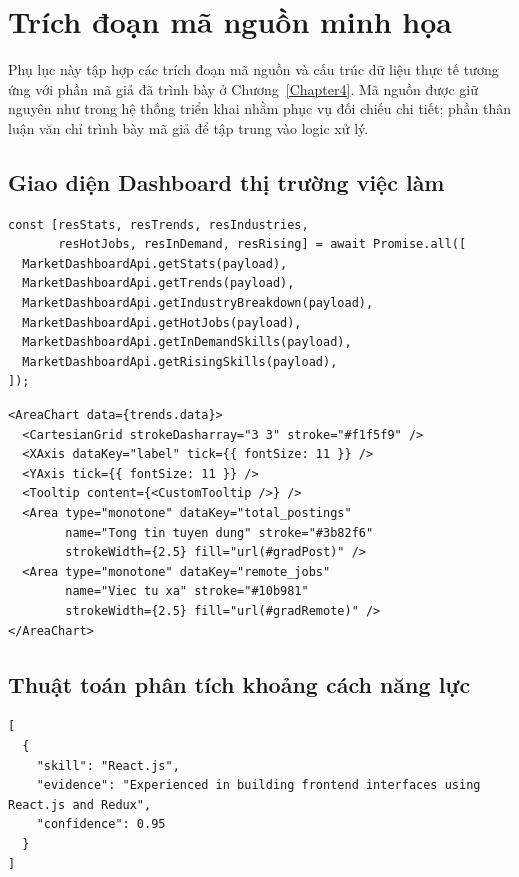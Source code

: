\chapter{Trích đoạn mã nguồn minh họa}
\label{Appendix:code}

Phụ lục này tập hợp các trích đoạn mã nguồn và cấu trúc dữ liệu thực tế tương ứng với phần mã giả đã trình bày ở Chương~\ref{Chapter4}. Mã nguồn được giữ nguyên như trong hệ thống triển khai nhằm phục vụ đối chiếu chi tiết; phần thân luận văn chỉ trình bày mã giả để tập trung vào logic xử lý.

\section{Giao diện Dashboard thị trường việc làm}

\begin{lstlisting}[caption=Khởi tạo sáu truy vấn API song song trong MarketDashboard.tsx, label=lst:code_dashboard_promise]
const [resStats, resTrends, resIndustries,
       resHotJobs, resInDemand, resRising] = await Promise.all([
  MarketDashboardApi.getStats(payload),
  MarketDashboardApi.getTrends(payload),
  MarketDashboardApi.getIndustryBreakdown(payload),
  MarketDashboardApi.getHotJobs(payload),
  MarketDashboardApi.getInDemandSkills(payload),
  MarketDashboardApi.getRisingSkills(payload),
]);
\end{lstlisting}

\begin{lstlisting}[caption=Kết xuất AreaChart xu hướng tuyển dụng bằng Recharts (trích MarketDashboard.tsx), label=lst:code_dashboard_areachart]
<AreaChart data={trends.data}>
  <CartesianGrid strokeDasharray="3 3" stroke="#f1f5f9" />
  <XAxis dataKey="label" tick={{ fontSize: 11 }} />
  <YAxis tick={{ fontSize: 11 }} />
  <Tooltip content={<CustomTooltip />} />
  <Area type="monotone" dataKey="total_postings"
        name="Tong tin tuyen dung" stroke="#3b82f6"
        strokeWidth={2.5} fill="url(#gradPost)" />
  <Area type="monotone" dataKey="remote_jobs"
        name="Viec tu xa" stroke="#10b981"
        strokeWidth={2.5} fill="url(#gradRemote)" />
</AreaChart>
\end{lstlisting}

\section{Thuật toán phân tích khoảng cách năng lực}

\begin{lstlisting}[caption=Ví dụ đầu ra JSON của bước trích xuất kỹ năng (Structured Output), label=lst:code_extract_json]
[
  {
    "skill": "React.js",
    "evidence": "Experienced in building frontend interfaces using React.js and Redux",
    "confidence": 0.95
  }
]
\end{lstlisting}

